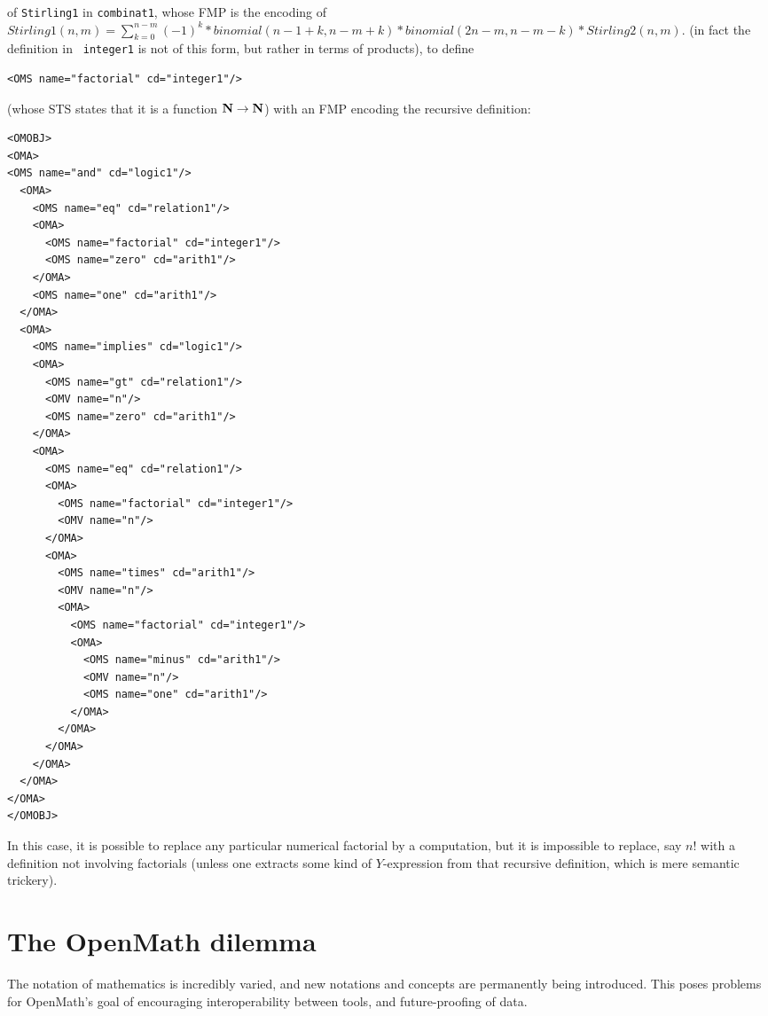\documentclass[11pt]{openmathTN}
\def\N{{\bf N}}
\begin{document}
\begin{enumerate}
{of {\tt Stirling1} in {\tt combinat1}, whose FMP is the encoding of
$Stirling1(n,m) = \sum_{k=0}^{n-m} (-1)^k * binomial(n-1+k, n-m+k) *
binomial(2n-m,n-m-k) * Stirling2(n,m)$.} (in fact the definition in {\tt
integer1} is not of this form, but rather in terms of products), to define
\begin{verbatim}
<OMS name="factorial" cd="integer1"/>
\end{verbatim}
(whose STS states that it is a function $\N\rightarrow\N$) with an FMP
encoding the recursive definition:
\begin{verbatim}
<OMOBJ>
<OMA>
<OMS name="and" cd="logic1"/>
  <OMA>
    <OMS name="eq" cd="relation1"/>
    <OMA>
      <OMS name="factorial" cd="integer1"/>
      <OMS name="zero" cd="arith1"/>
    </OMA>
    <OMS name="one" cd="arith1"/>
  </OMA>
  <OMA>
    <OMS name="implies" cd="logic1"/>
    <OMA>
      <OMS name="gt" cd="relation1"/>
      <OMV name="n"/>
      <OMS name="zero" cd="arith1"/>
    </OMA>
    <OMA>
      <OMS name="eq" cd="relation1"/>
      <OMA>
        <OMS name="factorial" cd="integer1"/>
        <OMV name="n"/>
      </OMA>
      <OMA>
        <OMS name="times" cd="arith1"/>
        <OMV name="n"/>
        <OMA>
          <OMS name="factorial" cd="integer1"/>
          <OMA>
            <OMS name="minus" cd="arith1"/>
            <OMV name="n"/>
            <OMS name="one" cd="arith1"/>
          </OMA>
        </OMA>
      </OMA>
    </OMA>
  </OMA>
</OMA>
</OMOBJ>
\end{verbatim}
In this case, it is possible to replace any particular numerical factorial
by a computation, but it is impossible to replace, say $n!$ with a
definition not involving factorials (unless one extracts some kind of
$Y$-expression from that recursive definition, which is mere semantic
trickery).
\end{enumerate}
\section{The OpenMath dilemma}
The notation of mathematics is incredibly varied, and new notations and
concepts are permanently being introduced. This poses problems for
OpenMath's goal of encouraging interoperability between tools, and
future-proofing of data.
\end{document}
